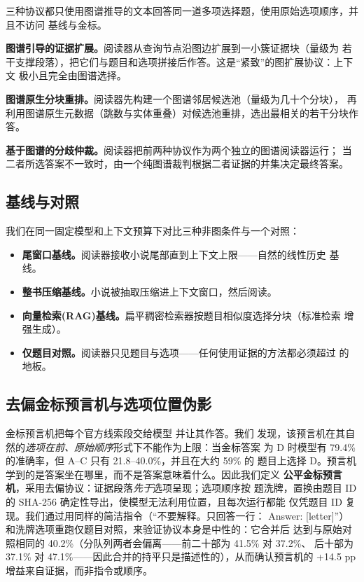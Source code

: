 \documentclass[UTF8,11pt]{ctexart}
\newcommand{\pp}{\ensuremath{\,\mathrm{pp}}}
\begin{document}
三种协议都只使用图谱推导的文本回答同一道多项选择题，使用原始选项顺序，并且不访问
基线与金标。

\textbf{图谱引导的证据扩展。}阅读器从查询节点沿图边扩展到一小簇证据块（量级为
若干支撑段落），把它们与题目和选项拼接后作答。这是``紧致''的图扩展协议：上下文
极小且完全由图谱选择。

\textbf{图谱原生分块重排。}阅读器先构建一个图谱邻居候选池（量级为几十个分块），
再利用图谱原生元数据（跳数与实体重叠）对候选池重排，选出最相关的若干分块作答。

\textbf{基于图谱的分歧仲裁。}阅读器把前两种协议作为两个独立的图谱阅读器运行；
当二者所选答案不一致时，由一个纯图谱裁判根据二者证据的并集决定最终答案。

\subsection{基线与对照}
\label{sec:baselines}

我们在同一固定模型和上下文预算下对比三种非图条件与一个对照：
\begin{itemize}
\item \textbf{尾窗口基线。}阅读器接收小说尾部直到上下文上限——自然的线性历史
  基线。
\item \textbf{整书压缩基线。}小说被抽取压缩进上下文窗口，然后阅读。
\item \textbf{向量检索(RAG)基线。}扁平稠密检索器按题目相似度选择分块（标准检索
  增强生成）。
\item \textbf{仅题目对照。}阅读器只见题目与选项——任何使用证据的方法都必须超过
  的地板。
\end{itemize}

\subsection{去偏金标预言机与选项位置伪影}
\label{sec:fairgold}

金标预言机把每个官方线索段交给模型 \citep{xu2024detectiveqa} 并让其作答。我们
发现，该预言机在其自然的\emph{选项在前、原始顺序}形式下不能作为上限：当金标答案
为 D 时模型有 79.4\% 的准确率，但 A--C 只有 21.8--40.0\%，并且在大约 59\% 的
题目上选择 D。预言机学到的是答案坐在哪里，而不是答案意味着什么。因此我们定义
\textbf{公平金标预言机}，采用去偏协议：证据段落\emph{先于}选项呈现；选项顺序按
题洗牌，置换由题目 ID 的 SHA-256 确定性导出，使模型无法利用位置，且每次运行都能
仅凭题目 ID 复现。我们通过用同样的简洁指令（``不要解释。只回答一行：
Answer: [letter]''）和洗牌选项重跑仅题目对照，来验证协议本身是中性的：它合并后
达到与原始对照相同的 40.2\%（分队列两者会偏离——前二十部为 41.5\% 对 37.2\%、
后十部为 37.1\% 对 47.1\%——因此合并的持平只是描述性的），从而确认预言机的
+14.5\,\pp{} 增益来自证据，而非指令或顺序。
\end{document}
